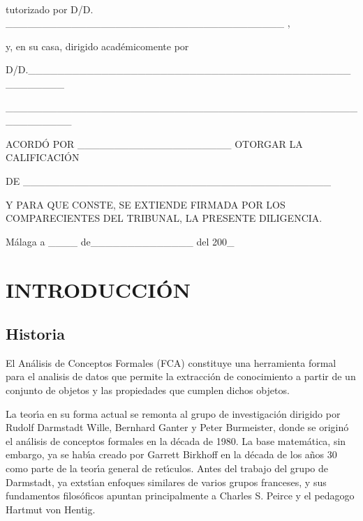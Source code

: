 \documentclass[12pt]{article}
\begin{document}
\leavevmode \\
tutorizado por D\textordmasculine{}/D\textordfeminine{}.
\_\_\_\_\_\_\_\_\_\_\_\_\_\_\_\_\_\_\_\_\_\_\_\_\_\_\_\_\_\_\_\_\_\_\_\_\_\_ ,



y, en su casa, dirigido acad\'{e}micomente por


D\textordmasculine{}/D\textordfeminine{}.\_\_\_\_\_\_\_\_\_\_\_\_\_\_\_\_\_\_\_\_\_\_\_\_\_\_\_\_\_\_\_\_\_\_\_\_\_\_\_\_\_\_\_\_\_\_\_\_\_\_\_\_


\_\_\_\_\_\_\_\_\_\_\_\_\_\_\_\_\_\_\_\_\_\_\_\_\_\_\_\_\_\_\_\_\_\_\_\_\_\_\_\_\_\_\_\_\_\_\_\_\_\_\_\_\_\_\_\_\_



ACORD\'{O} POR \_\_\_\_\_\_\_\_\_\_\_\_\_\_\_\_\_\_\_\_\_ OTORGAR LA
CALIFICACI\'{O}N

DE
\_\_\_\_\_\_\_\_\_\_\_\_\_\_\_\_\_\_\_\_\_\_\_\_\_\_\_\_\_\_\_\_\_\_\_\_\_\_\_\_\_\_

Y PARA QUE CONSTE, SE EXTIENDE FIRMADA POR LOS COMPARECIENTES DEL TRIBUNAL, LA
PRESENTE DILIGENCIA.

M\'{a}laga a \_\_\_\_ de\_\_\_\_\_\_\_\_\_\_\_\_\_\_ del 200\_

\newpage

\tableofcontents
\newpage

\section{INTRODUCCI\'{O}N}
	\subsection{Historia}
	

		El An\'{a}lisis de Conceptos Formales (FCA) constituye una herramienta formal
		para el analisis de datos que permite la extracci\'{o}n de conocimiento  a
		partir de un conjunto de objetos y las propiedades que cumplen dichos objetos.
		
		La teor\'{\i}a en su forma actual se remonta al grupo de investigaci\'{o}n
		dirigido por Rudolf Darmstadt Wille, Bernhard Ganter y Peter Burmeister, donde se
		origin\'{o} el an\'{a}lisis de conceptos formales en la d\'{e}cada de 1980. La
		base matem\'{a}tica, sin embargo, ya se hab\'{\i}a creado por Garrett Birkhoff en
		la d\'{e}cada de los a\~{n}os 30 como parte de la teor\'{\i}a general de
		ret\'{\i}culos. Antes del trabajo del grupo de Darmstadt, ya extst\'{\i}an
		enfoques similares de varios grupos franceses, y sus fundamentos filos\'{o}ficos
		apuntan principalmente a Charles S. Peirce y el pedagogo Hartmut von Hentig.
		
\end{document}
